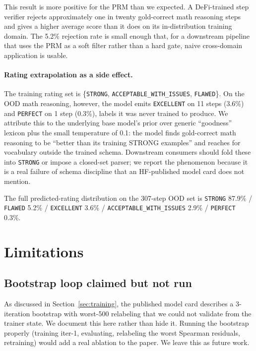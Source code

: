 \documentclass[10pt,letterpaper]{article}
\begin{document}
This result is more positive for the PRM than we expected. A DeFi-trained step verifier rejects approximately one in twenty gold-correct math reasoning steps and gives a higher average score than it does on its in-distribution training domain. The 5.2\% rejection rate is small enough that, for a downstream pipeline that uses the PRM as a soft filter rather than a hard gate, naive cross-domain application is usable.

\paragraph{Rating extrapolation as a side effect.} The training rating set is \{\texttt{STRONG}, \texttt{ACCEPTABLE\_WITH\_ISSUES}, \texttt{FLAWED}\}. On the OOD math reasoning, however, the model emits \texttt{EXCELLENT} on 11 steps (3.6\%) and \texttt{PERFECT} on 1 step (0.3\%), labels it was never trained to produce. We attribute this to the underlying base model's prior over generic ``goodness'' lexicon plus the small temperature of 0.1: the model finds gold-correct math reasoning to be ``better than its training STRONG examples'' and reaches for vocabulary outside the trained schema. Downstream consumers should fold these into \texttt{STRONG} or impose a closed-set parser; we report the phenomenon because it is a real failure of schema discipline that an HF-published model card does not mention.

The full predicted-rating distribution on the 307-step OOD set is \texttt{STRONG} 87.9\% / \texttt{FLAWED} 5.2\% / \texttt{EXCELLENT} 3.6\% / \texttt{ACCEPTABLE\_WITH\_ISSUES} 2.9\% / \texttt{PERFECT} 0.3\%.

\section{Limitations}
\label{sec:limitations}

\subsection{Bootstrap loop claimed but not run}

As discussed in Section~\ref{sec:training}, the published model card describes a 3-iteration bootstrap with worst-500 relabeling that we could not validate from the trainer state. We document this here rather than hide it. Running the bootstrap properly (training iter-1, evaluating, relabeling the worst Spearman residuals, retraining) would add a real ablation to the paper. We leave this as future work.
\end{document}
